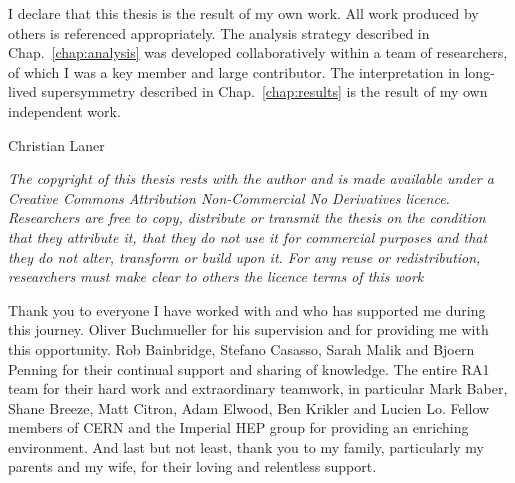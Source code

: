 \begin{declaration}
  I declare that this thesis is the result of my own work. All work produced by 
  others is referenced appropriately. The analysis strategy described in 
  Chap.~\ref{chap:analysis} was developed collaboratively within a team of 
  researchers, of which I was a key member and large contributor. The 
  interpretation in long-lived supersymmetry described in 
  Chap.~\ref{chap:results} is the result of my own independent work.
  \vspace*{1cm}
  \begin{flushright}
    Christian Laner
  \end{flushright}
  \vspace*{1.5cm}
	{\textit{The copyright of this thesis rests with the author and is made
	available under a Creative Commons Attribution Non-Commercial No
	Derivatives licence. Researchers are free to copy, distribute or
	transmit the thesis on the condition that they attribute it, that
	they do	not use it for commercial purposes and that they do not alter,
	transform or build upon it. For any reuse or redistribution,
	researchers must make clear to others the licence terms of this
	work}}
\end{declaration}


\begin{acknowledgements}
  Thank you to everyone I have worked with and who has supported me during this 
  journey. Oliver Buchmueller for his supervision and for providing 
  me with this opportunity. Rob Bainbridge, Stefano Casasso, Sarah Malik and 
  Bjoern Penning for their continual support and sharing of knowledge. The 
  entire RA1 team for their hard work and extraordinary teamwork, in particular 
  Mark Baber, Shane Breeze, Matt Citron, Adam Elwood, Ben Krikler and Lucien 
  Lo. Fellow members of CERN and the Imperial HEP group for providing an 
  enriching environment. And last but not least, thank you to my family, 
  particularly my parents and my wife, for their loving and relentless support.
\end{acknowledgements}


